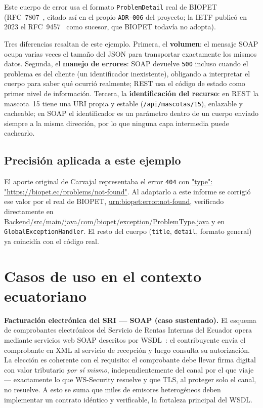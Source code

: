 Este cuerpo de error usa el formato \texttt{ProblemDetail} real de BIOPET
(RFC~7807~\parencite{rfc7807}, citado as\'i en el propio \texttt{ADR-006} del
proyecto; la IETF public\'o en 2023 el RFC~9457~\parencite{rfc9457} como sucesor,
que BIOPET todav\'ia no adopta).

Tres diferencias resaltan de este ejemplo. Primera, el \textbf{volumen}: el
mensaje SOAP ocupa varias veces el tama\~no del JSON para transportar
exactamente los mismos datos. Segunda, el \textbf{manejo de errores}: SOAP
devuelve \texttt{500} incluso cuando el problema es del cliente (un
identificador inexistente), obligando a interpretar el cuerpo para saber
qu\'e ocurri\'o realmente; REST usa el c\'odigo de estado como primer nivel
de informaci\'on. Tercera, la \textbf{identificaci\'on del recurso}: en REST
la mascota~15 tiene una URI propia y estable (\texttt{/api/mascotas/15}),
enlazable y cacheable; en SOAP el identificador es un par\'ametro dentro de
un cuerpo enviado siempre a la misma direcci\'on, por lo que ninguna capa
intermedia puede cachearlo.

\subsection*{Precisi\'on aplicada a este ejemplo}

El aporte original de Carvajal representaba el error \texttt{404} con
\url{"type": "https://biopet.ec/problems/not-found"}. Al adaptarlo a
este informe se corrigi\'o ese valor por el real de BIOPET,
\url{urn:biopet:error:not-found}, verificado directamente en
\url{Backend/src/main/java/com/biopet/exception/ProblemType.java} y en
\texttt{GlobalExceptionHandler}. El resto del cuerpo (\texttt{title},
\texttt{detail}, formato general) ya coincid\'ia con el c\'odigo real.

\section{Casos de uso en el contexto ecuatoriano}
\label{sec:soap-rest-ecuador}

\textbf{Facturaci\'on electr\'onica del SRI --- SOAP (caso sustentado).} El
esquema de comprobantes electr\'onicos del Servicio de Rentas Internas del
Ecuador opera mediante servicios web SOAP descritos por
WSDL~\parencite{sri-facturacion-electronica}: el contribuyente env\'ia el
comprobante en XML al servicio de recepci\'on y luego consulta su
autorizaci\'on. La elecci\'on es coherente con el requisito: el comprobante
debe llevar firma digital con valor tributario \emph{por s\'i mismo},
independientemente del canal por el que viaje --- exactamente lo que
WS-Security resuelve y que TLS, al proteger solo el canal, no resuelve. A
esto se suma que miles de emisores heterog\'eneos deben implementar un
contrato id\'entico y verificable, la fortaleza principal del WSDL.

